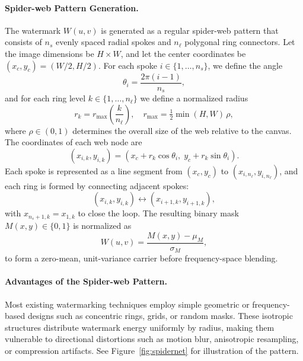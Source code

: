 \documentclass[lettersize,journal,review]{IEEEtran}
\begin{document}
\paragraph{Spider-web Pattern Generation.}
The watermark \(W(u,v)\) is generated as a regular spider-web pattern that consists of \(n_s\) evenly spaced radial spokes and \(n_\ell\) polygonal ring connectors.  
Let the image dimensions be \(H \times W\), and let the center coordinates be \((x_c,y_c)=(W/2,H/2)\).  
For each spoke \(i \in \{1,\ldots,n_s\}\), we define the angle
\begin{equation}
    \theta_i = \frac{2\pi(i-1)}{n_s},
\end{equation}
and for each ring level \(k \in \{1,\ldots,n_\ell\}\) we define a normalized radius
\begin{equation}
    r_k = r_{\max}\!\left(\frac{k}{n_\ell}\right), \quad r_{\max} = \tfrac{1}{2}\min(H,W)\,\rho,
\end{equation}
where \(\rho\in(0,1)\) determines the overall size of the web relative to the canvas.  
The coordinates of each web node are
\begin{equation}
    (x_{i,k},y_{i,k}) = (x_c + r_k\cos\theta_i,\; y_c + r_k\sin\theta_i).
\end{equation}
Each spoke is represented as a line segment from \((x_c,y_c)\) to \((x_{i,n_\ell},y_{i,n_\ell})\),  
and each ring is formed by connecting adjacent spokes:
\begin{equation}
    (x_{i,k},y_{i,k}) \longleftrightarrow (x_{i+1,k},y_{i+1,k}),
\end{equation}
with \(x_{n_s+1,k}=x_{1,k}\) to close the loop.  
The resulting binary mask \(M(x,y)\in\{0,1\}\) is normalized as
\begin{equation}\label{eq:mask}
    W(u,v)=\frac{M(x,y)-\mu_M}{\sigma_M},
\end{equation}
to form a zero-mean, unit-variance carrier before frequency-space blending.

\paragraph{Advantages of the Spider-web Pattern.}
Most existing watermarking techniques employ simple geometric or frequency-based designs such as concentric rings, grids, or random masks. These isotropic structures distribute watermark energy uniformly by radius, making them vulnerable to directional distortions such as motion blur, anisotropic resampling, or compression artifacts. See Figure~\ref{fig:spidernet} for illustration of the pattern.
\end{document}

